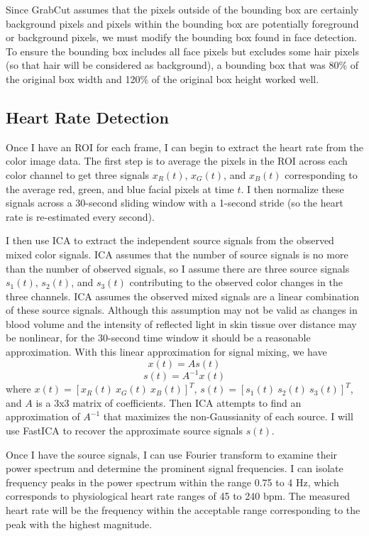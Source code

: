 \documentclass[10pt,twocolumn,letterpaper]{article}
\begin{document}
Since GrabCut assumes that the pixels outside of the bounding box are certainly background pixels and pixels within the bounding box are potentially foreground or background pixels, we must modify the bounding box found in face detection. To ensure the bounding box includes all face pixels but excludes some hair pixels (so that hair will be considered as background), a bounding box that was 80\% of the original box width and 120\% of the original box height worked well. 

\subsection{Heart Rate Detection}

Once I have an ROI for each frame, I can begin to extract the heart rate from the color image data. The first step is to average the pixels in the ROI across each color channel to get three signals $x_R(t)$, $x_G(t)$, and $x_B(t)$ corresponding to the average red, green, and blue facial pixels at time $t$. I then normalize these signals across a 30-second sliding window with a 1-second stride (so the heart rate is re-estimated every second).

I then use ICA to extract the independent source signals from the observed mixed color signals. ICA assumes that the number of source signals is no more than the number of observed signals, so I assume there are three source signals $s_1(t)$, $s_2(t)$, and $s_3(t)$ contributing to the observed color changes in the three channels. ICA assumes the observed mixed signals are a linear combination of these source signals. Although this assumption may not be valid as changes in blood volume and the intensity of reflected light in skin tissue over distance may be nonlinear, for the 30-second time window it should be a reasonable approximation. With this linear approximation for signal mixing, we have 
	$$x(t) = As(t)$$ 
	$$s(t) = A^{-1}x(t)$$
where $x(t) = [x_R(t)\ x_G(t)\ x_B(t)]^T$, $s(t) = [s_1(t)\ s_2(t)\ s_3(t)]^T$, and $A$ is a 3x3 matrix of coefficients. Then ICA attempts to find an approximation of $A^{-1}$ that maximizes the non-Gaussianity of each source. I will use FastICA to recover the approximate source signals $s(t)$.

Once I have the source signals, I can use Fourier transform to examine their power spectrum and determine the prominent signal frequencies. I can isolate frequency peaks in the power spectrum within the range 0.75 to 4 Hz, which corresponds to physiological heart rate ranges of 45 to 240 bpm. The measured heart rate will be the frequency within the acceptable range corresponding to the peak with the highest magnitude.
\end{document}
